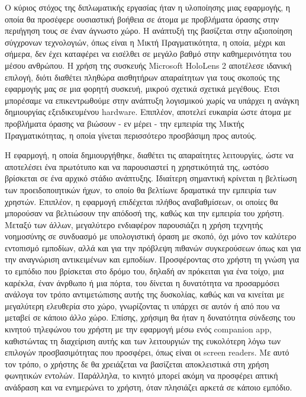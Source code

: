 Ο κύριος στόχος της διπλωματικής εργασίας ήταν η υλοποίησης μιας εφαρμογής, η οποία θα προσέφερε ουσιαστική βοήθεια σε άτομα με προβλήματα όρασης	στην περιήγηση τους σε έναν άγνωστο χώρο. Η ανάπτυξή της βασίζεται στην αξιοποίηση σύγχρονων τεχνολογιών, όπως είναι η Μικτή Πραγματικότητα, η οποία, μέχρι και σήμερα, δεν έχει καταφέρει να εισέλθει σε μεγάλο βαθμό στην καθημερινότητα του μέσου ανθρώπου. Η χρήση της συσκευής Microsoft HoloLens 2 αποτέλεσε ιδανική επιλογή, διότι διαθέτει πληθώρα αισθητήρων απαραίτητων για τους σκοπούς της εφαρμογής μας σε μια φορητή συσκευή, μικρού σχετικά σχετικά μεγέθους. Έτσι μπορέσαμε να επικεντρωθούμε στην ανάπτυξη λογισμικού χωρίς να υπάρχει η ανάγκη δημιουργίας εξειδικευμένου hardware. Επιπλέον, αποτελεί ευκαιρία ώστε άτομα με προβλήματα όρασης να βιώσουν - εν μέρει - την εμπειρία της Μικτής Πραγματικότητας, η οποία γίνεται περισσότερο προσβάσιμη προς αυτούς. %

Η εφαρμογή, η οποία δημιουργήθηκε, διαθέτει τις απαραίτητες λειτουργίες, ώστε να αποτελέσει ένα πρωτότυπο και να παρουσιαστεί η χρηστικότητά της, ωστόσο βρίσκεται σε ένα αρχικό στάδιο ανάπτυξης. Ιδιαίτερη σημαντική κρίνεται η βελτίωση των προειδοποιητικών ήχων, το οποίο θα βελτίωνε δραματικά την εμπειρία των χρηστών. Επιπλέον, η εφαρμογή επιδέχεται πλήθος αναβαθμίσεων, οι οποίες θα μπορούσαν να βελτιώσουν την απόδοσή της, καθώς και την εμπειρία του χρήστη. Μεταξύ των άλλων, μεγαλύτερο ενδιαφέρον παρουσιάζει η χρήση τεχνητής νοημοσύνης σε συνδυασμό με υπολογιστική όραση με σκοπό, όχι μόνο τον καλύτερο εντοπισμό εμποδίων, αλλά και για την πρόβλεψη πιθανών συγκερούσεων όπως και για την αναγνώριση αντικειμένων και εμποδίων. Προσφέροντας στο χρήστη τη γνώση για το εμπόδιο που βρίσκεται στο δρόμο του, δηλαδή αν πρόκειται για ένα τοίχο, μια καρέκλα, έναν άνρθωπο ή μια πόρτα, του δίνεται η δυνατότητα να προσαρμόσει ανάλογα τον τρόπο αντιμετώπισης αυτής της δυσκολίας, καθώς και να κινείται με μεγαλύτερη ελευθερία στο χώρο, γνωρίζοντας τι υπάρχει σε αυτόν ή από που να μεταβεί σε κάποιο άλλο χώρο. Επίσης, χρήσιμη θα ήταν η δυνατότητα σύνδεσης του κινητού τηλεφώνου του χρήστη με την εφαρμογή μέσω ενός companion app, καθιστώντας τη διαχείριση αυτής και των λειτουργιών της ευκολότερη λόγω των επιλογών προσβασιμότητας που προσφέρει, όπως είναι οι screen readers. Με αυτό τον τρόπο, ο χρήστης δε θα χρειάζεται να βασίζεται αποκλειστικά στη χρήση φωνητικών εντολών. Παράλληλα, το κινητό μπορεί ακόμη να προσφέρει απτική ανάδραση και να ενημερώνει το χρήστη, όταν πλησιάζει αρκετά σε κάποιο εμπόδιο.
